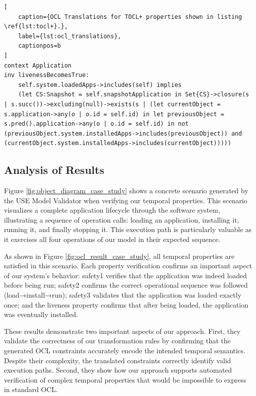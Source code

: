\begin{lstlisting}[
    caption={OCL Translations for TOCL+ properties shown in listing \ref{lst:tocl+}.},
    label={lst:ocl_translations},
    captionpos=b
]
context Application
inv livenessBecomesTrue:
    self.system.loadedApps->includes(self) implies
    (let CS:Snapshot = self.snapshotApplication in Set{CS}->closure(s | s.succ())->excluding(null)->exists(s | (let currentObject = s.application->any(o | o.id = self.id) in let previousObject = s.pred().application->any(o | o.id = self.id) in not (previousObject.system.installedApps->includes(previousObject)) and (currentObject.system.installedApps->includes(currentObject)))))
\end{lstlisting}


\subsection{Analysis of Results}

\hspace{1cm} Figure \ref{fig:object_diagram_case_study} shows a concrete scenario 
generated by the USE Model Validator when verifying our temporal properties. This 
scenario visualizes a complete application lifecycle through the software system, 
illustrating a sequence of operation calls: loading an application, installing it, 
running it, and finally stopping it. This execution path is particularly valuable 
as it exercises all four operations of our model in their expected sequence.

As shown in Figure \ref{fig:ocl_result_case_study}, all temporal properties are 
satisfied in this scenario. Each property verification confirms an important aspect 
of our system's behavior: safety1 verifies that the application was indeed loaded 
before being run; safety2 confirms the correct operational sequence was followed 
(load→install→run); safety3 validates that the application was loaded exactly once; 
and the liveness property confirms that after being loaded, the application was 
eventually installed.

These results demonstrate two important aspects of our approach. First, they validate 
the correctness of our transformation rules by confirming that the generated OCL 
constraints accurately encode the intended temporal semantics. Despite their 
complexity, the translated constraints correctly identify valid execution paths. 
Second, they show how our approach supports automated verification of complex 
temporal properties that would be impossible to express in standard OCL.

